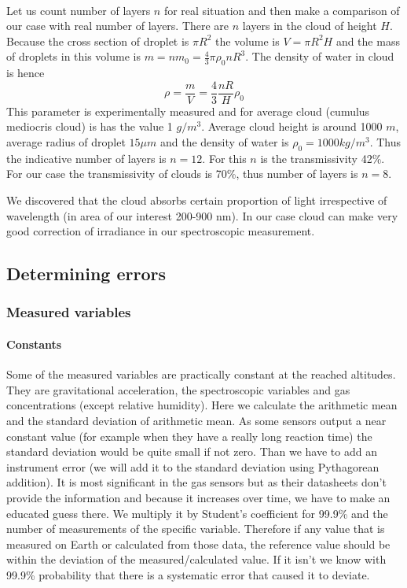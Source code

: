 \documentclass{cfp}
\begin{document}
\

Let us count number of layers $n$ for real situation and then make a comparison of our case with real number of layers.
There are $n$ layers in the cloud of height $H$. Because the cross section of droplet is $\pi R^{2}$ the volume is $V=\pi R^{2}H$ and the mass of droplets in this volume is $m=n m_{0}=\frac{4}{3} \pi \rho_{0} n R^{3}$. The density of water in cloud is hence
$$\rho=\frac{m}{V}=\frac{4}{3} \frac{nR}{H} \rho_0$$
This parameter is experimentally measured and for average cloud (cumulus mediocris cloud) is has the value 1 $g/m^3$. Average cloud height is around 1000 $m$, average radius of droplet $15 \mu m$ and the density of water is $\rho_{0}=1000 kg/m^3$. Thus the indicative number of layers is $n = 12$. For this $n$ is the transmissivity 42\%.
For our case the transmissivity of clouds is 70\%, thus number of layers is $n = 8$.
\

We discovered that the cloud absorbs certain proportion of light irrespective of wavelength (in area of our interest 200-900 nm). In our case cloud can make very good correction of irradiance in our spectroscopic measurement.
\subsection{Determining errors}
\subsubsection{Measured variables}
\paragraph{Constants} Some of the measured variables are practically constant at the reached altitudes. They are gravitational acceleration, the spectroscopic variables and gas concentrations (except relative humidity). Here we calculate the arithmetic mean and the standard deviation of arithmetic mean. As some sensors output a near constant value (for example when they have a really long reaction time) the standard deviation would be quite small if not zero. Than we have to add an instrument error (we will add it to the standard deviation using Pythagorean addition). It is most significant in the gas sensors but as their datasheets don't provide the information and because it increases over time, we have to make an educated guess there. We multiply it by Student's coefficient for 99.9\% and the number of measurements of the specific variable. Therefore if any value that is measured on Earth or calculated from those data, the reference value should be within the deviation of the measured/calculated value. If it isn't we know with 99.9\% probability that there is a systematic error that caused it to deviate.
\end{document}
